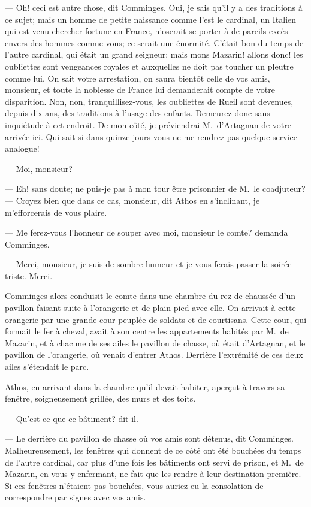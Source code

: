 — Oh! ceci est autre chose, dit Comminges. Oui, je sais qu'il y a des traditions à ce sujet; mais un homme de petite naissance comme l'est le cardinal, un Italien qui est venu chercher fortune en France, n'oserait se porter à de pareils excès envers des hommes comme vous; ce serait une énormité. C'était bon du temps de l'autre cardinal, qui était un grand seigneur; mais mons Mazarin! allons donc! les oubliettes sont vengeances royales et auxquelles ne doit pas toucher un pleutre comme lui. On sait votre arrestation, on saura bientôt celle de vos amis, monsieur, et toute la noblesse de France lui demanderait compte de votre disparition. Non, non, tranquillisez-vous, les oubliettes de Rueil sont devenues, depuis dix ans, des traditions à l'usage des enfants. Demeurez donc sans inquiétude à cet endroit. De mon côté, je préviendrai M.~d'Artagnan de votre arrivée ici. Qui sait si dans quinze jours vous ne me rendrez pas quelque service analogue!

— Moi, monsieur?

— Eh! sans doute; ne puis-je pas à mon tour être prisonnier de M.~le coadjuteur?
— Croyez bien que dans ce cas, monsieur, dit Athos en s'inclinant, je m'efforcerais de vous plaire.

— Me ferez-vous l'honneur de souper avec moi, monsieur le comte? demanda Comminges.

— Merci, monsieur, je suis de sombre humeur et je vous ferais passer la soirée triste. Merci.

Comminges alors conduisit le comte dans une chambre du rez-de-chaussée d'un pavillon faisant suite à l'orangerie et de plain-pied avec elle. On arrivait à cette orangerie par une grande cour peuplée de soldats et de courtisans. Cette cour, qui formait le fer à cheval, avait à son centre les appartements habités par M.~de Mazarin, et à chacune de ses ailes le pavillon de chasse, où était d'Artagnan, et le pavillon de l'orangerie, où venait d'entrer Athos. Derrière l'extrémité de ces deux ailes s'étendait le parc.

Athos, en arrivant dans la chambre qu'il devait habiter, aperçut à travers sa fenêtre, soigneusement grillée, des murs et des toits.

— Qu'est-ce que ce bâtiment? dit-il.

— Le derrière du pavillon de chasse où vos amis sont détenus, dit Comminges. Malheureusement, les fenêtres qui donnent de ce côté ont été bouchées du temps de l'autre cardinal, car plus d'une fois les bâtiments ont servi de prison, et M.~de Mazarin, en vous y enfermant, ne fait que les rendre à leur destination première. Si ces fenêtres n'étaient pas bouchées, vous auriez eu la consolation de correspondre par signes avec vos amis.

